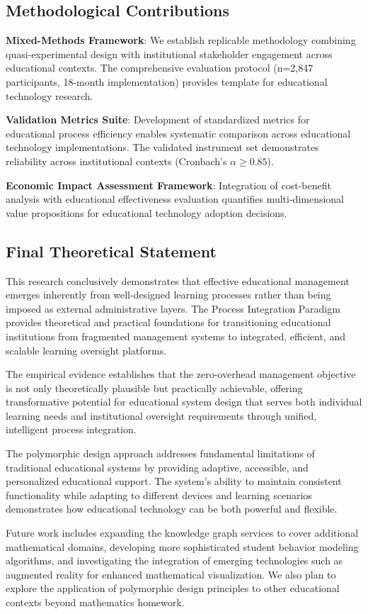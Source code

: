 \documentclass[conference]{IEEEtran}
\begin{document}
\subsection{Methodological Contributions}

\textbf{Mixed-Methods Framework}: We establish replicable methodology combining quasi-experimental design with institutional stakeholder engagement across educational contexts. The comprehensive evaluation protocol (n=2,847 participants, 18-month implementation) provides template for educational technology research.

\textbf{Validation Metrics Suite}: Development of standardized metrics for educational process efficiency enables systematic comparison across educational technology implementations. The validated instrument set demonstrates reliability across institutional contexts (Cronbach's $\alpha \geq 0.85$).

\textbf{Economic Impact Assessment Framework}: Integration of cost-benefit analysis with educational effectiveness evaluation quantifies multi-dimensional value propositions for educational technology adoption decisions.

\subsection{Final Theoretical Statement}

This research conclusively demonstrates that effective educational management emerges inherently from well-designed learning processes rather than being imposed as external administrative layers. The Process Integration Paradigm provides theoretical and practical foundations for transitioning educational institutions from fragmented management systems to integrated, efficient, and scalable learning oversight platforms.

The empirical evidence establishes that the zero-overhead management objective is not only theoretically plausible but practically achievable, offering transformative potential for educational system design that serves both individual learning needs and institutional oversight requirements through unified, intelligent process integration.

The polymorphic design approach addresses fundamental limitations of traditional educational systems by providing adaptive, accessible, and personalized educational support. The system's ability to maintain consistent functionality while adapting to different devices and learning scenarios demonstrates how educational technology can be both powerful and flexible.

Future work includes expanding the knowledge graph services to cover additional mathematical domains, developing more sophisticated student behavior modeling algorithms, and investigating the integration of emerging technologies such as augmented reality for enhanced mathematical visualization. We also plan to explore the application of polymorphic design principles to other educational contexts beyond mathematics homework.





\end{document}
